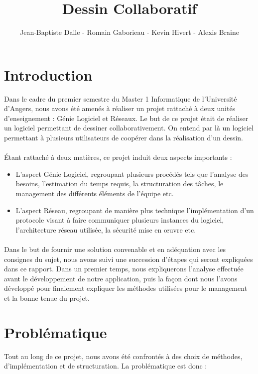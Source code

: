 \documentclass[a4paper,11pt]{article}
\title{Dessin Collaboratif}
\author{Jean-Baptiste Dalle - Romain Gaborieau - Kevin Hivert - Alexis Braine}
\date{}
\begin{document}
\maketitle

\clearpage

\tableofcontents

\clearpage

\section{Introduction}
Dans le cadre du premier semestre du Master 1 Informatique de l'Université d'Angers, nous avons été amenés à réaliser un projet rattaché à deux unités d'enseignement : Génie Logiciel et Réseaux. Le but de ce projet était de réaliser un logiciel permettant de dessiner collaborativement. On entend par là un logiciel permettant à plusieurs utilisateurs de coopérer dans la réalisation d'un dessin.

\paragraph{} Étant rattaché à deux matières, ce projet induit deux aspects importants :

\begin{itemize}
	\item L'aspect Génie Logiciel, regroupant plusieurs procédés tels que l'analyse des besoins, l'estimation du temps requis, la structuration des tâches, le management des différents éléments de l'équipe etc.
	\item L'aspect Réseau, regroupant de manière plus technique l'implémentation d'un protocole visant à faire communiquer plusieurs instances du logiciel, l'architecture réseau utilisée, la sécurité mise en œuvre etc.
\end{itemize}

\paragraph{} Dans le but de fournir une solution convenable et en adéquation avec les consignes du sujet, nous avons suivi une succession d'étapes qui seront expliquées dans ce rapport. Dans un premier temps, nous expliquerons l'analyse effectuée avant le développement de notre application, puis la façon dont nous l'avons développé pour finalement expliquer les méthodes utilisées pour le management et la bonne tenue du projet.


\section{Problématique}
Tout au long de ce projet, nous avons été confrontés à des choix de méthodes, d'implémentation et de structuration. La problématique est donc :
\end{document}
